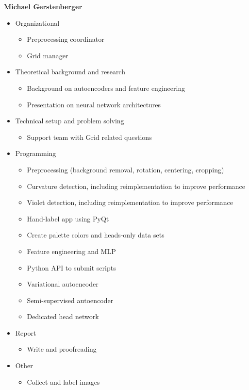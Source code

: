 \bigskip
\textbf{Michael Gerstenberger}
\begin{itemize}
	\item Organizational
	\begin{itemize}
		\item Preprocessing coordinator
		\item Grid manager
	\end{itemize}
	\item Theoretical background and research
	\begin{itemize}
		\item Background on autoencoders and feature engineering
		\item Presentation on neural network architectures
	\end{itemize}
	\item Technical setup and problem solving
	\begin{itemize}
		\item Support team with Grid related questions
	\end{itemize}
	\item Programming
	\begin{itemize}
		\item Preprocessing (background removal, rotation, centering, cropping)
		\item Curvature detection, including reimplementation to improve performance
		\item Violet detection, including reimplementation to improve performance
		\item Hand-label app using PyQt
		\item Create palette colors and heads-only data sets
		\item Feature engineering and MLP
		\item Python API to submit scripts
		\item Variational autoencoder
		\item Semi-supervised autoencoder
		\item Dedicated head network
	\end{itemize}
	\item Report
	\begin{itemize}
		\item Write and proofreading
	\end{itemize}
	\item Other
	\begin{itemize}
		\item Collect and label images
	\end{itemize}
\end{itemize} 

